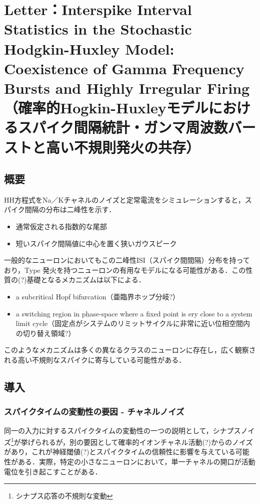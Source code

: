 \documentclass[dvipdfmx, A4j, twocolumn, 10.5pt]{jsarticle}
\begin{document}
\vspace{\baselineskip}
\vspace{\baselineskip}

\section{Letter：Interspike Interval Statistics in the Stochastic Hodgkin-Huxley Model: Coexistence of Gamma Frequency Bursts and Highly Irregular Firing（確率的Hogkin-Huxleyモデルにおけるスパイク間隔統計・ガンマ周波数バーストと高い不規則発火の共存）}
\subsection{概要}
HH方程式をNa／Kチャネルのノイズと定常電流をシミュレーションすると，スパイク間隔の分布は二峰性を示す．
\begin{itemize}
 \item 通常仮定される指数的な尾部
 \item 短いスパイク間隔値に中心を置く狭いガウスピーク
\end{itemize}
一般的なニューロンにおいてもこの二峰性ISI（スパイク間間隔）分布を持っており，Type  発火を持つニューロンの有用なモデルになる可能性がある．この性質の(?)基礎となるメカニズムは以下による．
\begin{itemize}
 \item a subcritical Hopf bifurcation（亜臨界ホップ分岐?）
 \item a switching region in phase-space where a fixed point is ery close to a system limit cycle（固定点がシステムのリミットサイクルに非常に近い位相空間内の切り替え領域?）
\end{itemize}

このようなメカニズムは多くの異なるクラスのニューロンに存在し，広く観察される高い不規則なスパイクに寄与している可能性がある．

\subsection{導入}
\subsubsection{スパイクタイムの変動性の要因 - チャネルノイズ}
同一の入力に対するスパイクタイムの変動性の一つの説明として，シナプスノイズ\footnote{シナプス応答の不規則な変動}が挙げられるが，別の要因として確率的イオンチャネル活動(?)からのノイズがあり，これが神経閾値(?)とスパイクタイムの信頼性に影響を与えている可能性がある．実際，特定の小さなニューロンにおいて，単一チャネルの開口が活動電位を引き起こすことがある．
\end{document}
